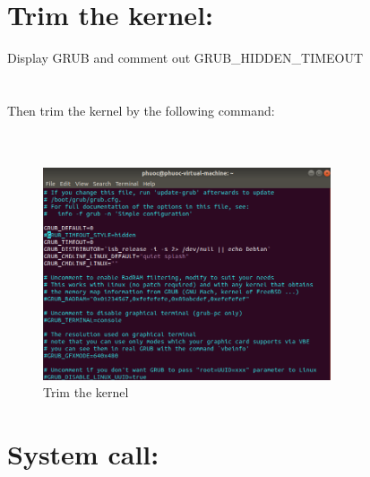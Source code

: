 \documentclass[a4paper]{article}
\begin{document}
\section{Trim the kernel:}
Display GRUB and comment out GRUB\_HIDDEN\_TIMEOUT\\
\noindent{}\\
\\
Then trim the kernel by the following command:\\
\noindent{}\\
\\
\begin{figure}[h!]
\begin{center}
\includegraphics[width=8.5cm]{4.png}
\caption{Trim the kernel}
\end{center}
\end{figure}
\newpage
\section{System call:}
\end{document}
